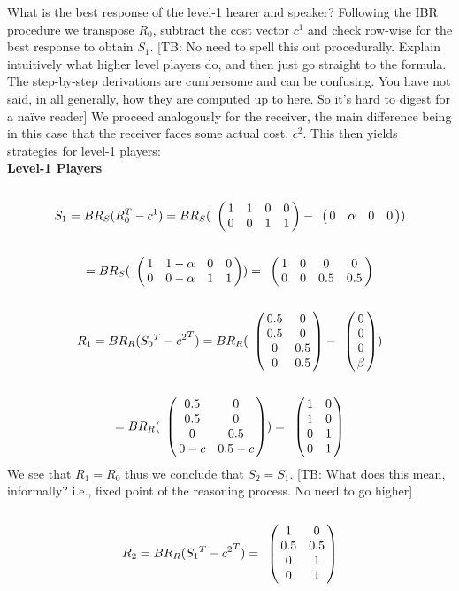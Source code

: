 \documentclass[10pt]{article}
\newcommand{\tb}[1]{\textcolor[rgb]{.8,.33,.0}{[TB: #1]}}%
\begin{document}
What is the best response of the level-1 hearer and speaker? Following the IBR procedure we transpose $R_0$, subtract the cost vector $c^1$ and check row-wise for the best response to obtain $S_1$. \tb{No need to spell this out procedurally. Explain intuitively what higher level players do, and then just go straight to the formula. The step-by-step derivations are cumbersome and can be confusing. You have not said, in all generally, how they are computed up to here. So it's hard to digest for a na\"ive reader}  We proceed analogously for the receiver, the main difference being in this case that the receiver faces some actual cost, $c^2$. This then yields strategies for level-1 players:\\ %
\textbf{Level-1 Players}\\
\begin{equation*}
S_1= BR_S(R^T_0-c^1)=
BR_S(
\bordermatrix{
            & & & &    \cr
 &       1 &         1 & 0       & 0 \cr
 &       0 &         0 & 1      & 1
 }
-
\bordermatrix{
            & & & &    \cr
 &       0 &         \alpha & 0       & 0 \cr
 }
)
\end{equation*}
\begin{equation*}
=BR_S(
\bordermatrix{
                & & & &    \cr
     &       1 &         1-\alpha & 0       & 0 \cr
     &       0 &         0-\alpha & 1      & 1
 }
 )
=
\bordermatrix{
                 & & & &    \cr
      &       1 &         0 & 0       & 0 \cr
      &       0 &         0 & 0.5      & 0.5
  }
\end{equation*}
\begin{equation*}
R_1=BR_R({S_0}^T-{c^2}^T)=
BR_R(
\bordermatrix{
            &  & \cr
    & 0.5 & 0 \cr
     & 0.5 & 0 \cr
     & 0 & 0.5 \cr
     & 0 & 0.5 \cr
 }
-
\bordermatrix{
  & \cr
    & 0 \cr
     & 0 \cr
     & 0 \cr
     & \beta \cr
 }
)
\end{equation*}
\begin{equation*}
=
BR_R(
\bordermatrix{
            &  & \cr
    & 0.5 & 0 \cr
     & 0.5 & 0 \cr
     & 0 & 0.5 \cr
     & 0-c & 0.5-c \cr
 }
 )
=
\bordermatrix{
            &  & \cr
    & 1 & 0 \cr
     & 1 & 0 \cr
     & 0 & 1 \cr
     & 0 & 1 \cr
 }
\end{equation*}
We see that $R_1=R_0$ thus we conclude that $S_2=S_1$. \tb{What does this mean, informally? i.e., fixed point of the reasoning process. No need to go higher}
\begin{equation*}
R_2=BR_R({S_1}^T-{c^2}^T)=
\bordermatrix{
            &  & \cr
    & 1 & 0 \cr
     & 0.5 & 0.5 \cr
     & 0 & 1 \cr
     & 0 & 1 \cr
 }
\end{equation*}
\end{document}
